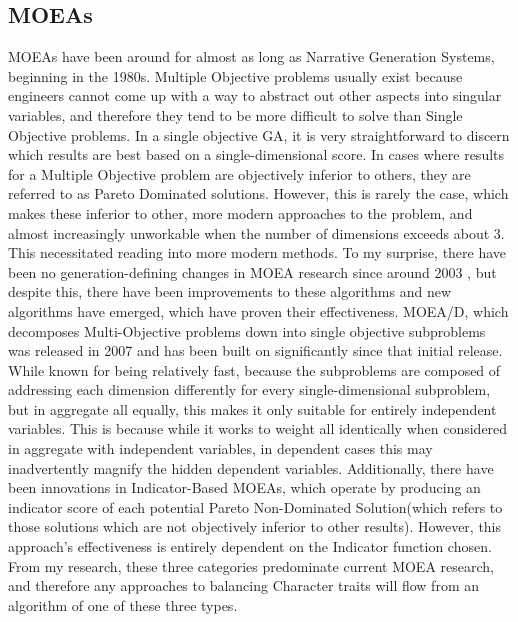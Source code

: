 \documentclass[11pt]{article}
\begin{document}
\subsection{MOEAs}
MOEAs have been around for almost as long as Narrative Generation Systems, beginning in the 1980s. Multiple Objective problems usually exist because engineers cannot come up with a way to abstract out other aspects into singular variables, and therefore they tend to be more difficult to solve than Single Objective problems. In a single objective GA, it is very straightforward to discern which results are best based on a single-dimensional score. In cases where results for a Multiple Objective problem are objectively inferior to others, they are referred to as Pareto Dominated solutions. However, this is rarely the case, which makes these inferior to other, more modern approaches to the problem\cite{AchievementScalarazingIndicatorBased}, and almost increasingly unworkable when the number of dimensions exceeds about 3. This necessitated reading into more modern methods. To my surprise, there have been no generation-defining changes in MOEA research since around 2003 \cite{MOEASurvey1}, but despite this, there have been improvements to these algorithms and new algorithms have emerged, which have proven their effectiveness. MOEA/D, which decomposes Multi-Objective problems down into single objective subproblems \cite{MOEAD} was released in 2007 and has been built on significantly since that initial release. While known for being relatively fast, because the subproblems are composed of addressing each dimension differently for every single-dimensional subproblem, but in aggregate all equally, this makes it only suitable for entirely independent variables. This is because while it works to weight all identically when considered in aggregate with independent variables, in dependent cases this may inadvertently magnify the hidden dependent variables.  Additionally, there have been innovations in Indicator-Based MOEAs, which operate by producing an indicator score of each potential Pareto Non-Dominated Solution(which refers to those solutions which are not objectively inferior to other results). However, this approach's effectiveness is entirely dependent on the Indicator function chosen. From my research, these three categories predominate current MOEA research, and therefore any approaches to balancing Character traits will flow from an algorithm of one of these three types.\\
\end{document}
